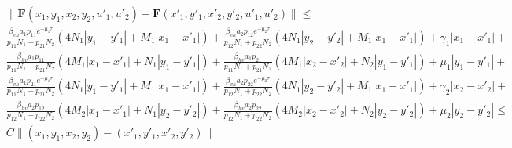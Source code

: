 \begin{align*}
  &\|\mathbf{F}(x_1, y_1, x_2, y_2, u'_1, u'_2) - \mathbf{F}(x'_1, y'_1, x'_2, y'_2, u'_1, u'_2)\| \leq \\
  &\frac{\beta_{vh} a_1 p_{11} e^{-\mu_1 \tau}}{p_{11} N_1 + p_{21} N_2} (4 N_1 |y_1 - y'_1| + M_1 |x_1 - x'_1|) +
  \frac{\beta_{vh} a_2 p_{12} e^{-\mu_2 \tau}}{p_{12} N_1 + p_{22} N_2}(4 N_1 |y_2 - y'_2| + M_1 |x_1 - x'_1|) + \gamma_1 |x_1-x'_1| + \\
  &\frac{\beta_{hv} a_1 p_{11}}{p_{11} N_1 + p_{21} N_2} (4 M_1 |x_1 - x'_1| + N_1 |y_1 - y'_1|) +
  \frac{\beta_{hv} a_1 p_{21}}{p_{11} N_1 + p_{21} N_2} (4 M_1 |x_2 - x'_2| + N_2 |y_1 - y'_1|) + \mu_1 |y_1 - y'_1| + \\
  &\frac{\beta_{vh} a_1 p_{21} e^{-\mu_1 \tau}}{p_{11} N_1 + p_{21} N_2} (4 N_1 |y_1 - y'_1| + M_1 |x_1 - x'_1|) +
  \frac{\beta_{vh} a_2 p_{22} e^{-\mu_2 \tau}}{p_{12} N_1 + p_{22} N_2}(4 N_1|y_2 - y'_2| + M_1 |x_1 - x'_1|) + \gamma_2 |x_2-x'_2| + \\
  &\frac{\beta_{hv} a_2 p_{12}}{p_{12} N_1 + p_{22} N_2} (4 M_2 |x_1 - x'_1| + N_1 |y_2 - y'_2|) +
  \frac{\beta_{hv} a_2 p_{22}}{p_{12} N_1 + p_{22} N_2} (4 M_2 |x_2 - x'_2| + N_2 |y_2 - y'_2|) + \mu_2 |y_2 - y'_2| \leq \\
  & C \|(x_1, y_1, x_2, y_2) - (x'_1, y'_1, x'_2, y'_2)\|
\end{align*}
